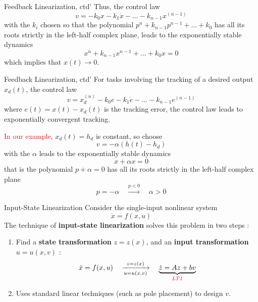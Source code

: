 \documentclass{beamer}
\begin{document}
  \begin{frame}{Feedback Linearization, ctd'}
    Thus, the control law
    $$ v = -k_{0}x-k_{1}\dot{x}- \dots - k_{n-1}x^{(n-1)} $$
    with the $k_{i}$ chosen so that the polynomial $p^{n}+k_{n-1}p^{n-1} + \dots + k_{0}$ has all its roots strictly in the left-half complex plane, leads to the exponentially stable dynamics
    $$
    x^{n}+k_{n-1}x^{n-1}+\dots+k_{0}x = 0
    $$
    which implies that $x(t) \rightarrow 0$.
  \end{frame}

  \begin{frame}{Feedback Linearization, ctd'}
    For tasks involving the tracking of a desired output $x_{d}(t)$, the control law
    \begin{equation}\label{tracking}
      v = x_{d}^{(n)} - k_{0}e - k_{1}\dot{e}-\dots-k_{n-1}e^{(n-1)}
    \end{equation}
    where $e(t) = x(t)-x_{d}(t)$ is the tracking error, the control law leads to exponentially convergent tracking.
    \par \vspace{-5pt}
    \textcolor{red}{In our example}, $x_{d}(t)=h_{d}$ is constant, so choose
    $$v=-\alpha(h(t) - h_{d})$$
    with the $\alpha$ leads to the exponentially stable dynamics
    $$
    \dot{x} + \alpha x=0
    $$
    that is the polynomial $p+\alpha=0$ has all its roots strictly in the left-half complex plane
    $$
    p = -\alpha \quad \xrightarrow{p < 0} \quad \alpha > 0
    $$

  \end{frame}



  \begin{frame}{Input-State Linearization}
    Consider the single-input nonlinear system
    $$ \dot{x} = f(x,u) $$
    The technique of \textbf{input-state linearization} solves this problem in two steps :
    \begin{enumerate}
      \item Find a \textbf{state transformation} $z=z(x)$, and an \textbf{input transformation} $u=u(x,v)$ :
          $$ \dot{x} = f(x,u) \quad \xrightarrow[u=u(x,v)]{z=z(x)} \quad \underbrace{\dot{z}=Az+bv}_{{\color{red}LTI}} $$
      \item Uses standard linear techniques (such as pole placement) to design $v$.
    \end{enumerate}
  \end{frame}
\end{document}
